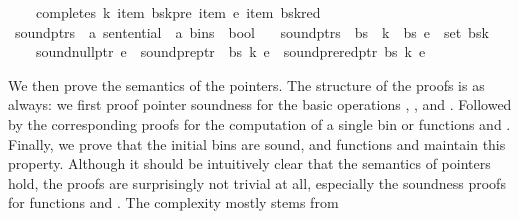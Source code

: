 \begin{isabellebody}
\ \ \ \ completes\ k\ {\isacharparenleft}{\kern0pt}item\ {\isacharparenleft}{\kern0pt}bs{\isacharbang}{\kern0pt}k{\isacharprime}{\kern0pt}{\isacharbang}{\kern0pt}pre{\isacharparenright}{\kern0pt}{\isacharparenright}{\kern0pt}\ {\isacharparenleft}{\kern0pt}item\ e{\isacharparenright}{\kern0pt}\ {\isacharparenleft}{\kern0pt}item\ {\isacharparenleft}{\kern0pt}bs{\isacharbang}{\kern0pt}k{\isacharbang}{\kern0pt}red{\isacharparenright}{\kern0pt}{\isacharparenright}{\kern0pt}{\isachardoublequoteclose}\isanewline
\isanewline
{}\isamarkupfalse%
\ sound{\isacharunderscore}{\kern0pt}ptrs\ {\isacharcolon}{\kern0pt}{\isacharcolon}{\kern0pt}\ {\isachardoublequoteopen}{\isacharprime}{\kern0pt}a\ sentential\ {\isasymRightarrow}\ {\isacharprime}{\kern0pt}a\ bins\ {\isasymRightarrow}\ bool{\isachardoublequoteclose}\ \isanewline
\ \ {\isachardoublequoteopen}sound{\isacharunderscore}{\kern0pt}ptrs\ {\isasymomega}\ bs\ {\isasymequiv}\ {\isasymforall}k\ {\isacharless}{\kern0pt}\ {\isacharbar}{\kern0pt}bs{\isacharbar}{\kern0pt}{\isachardot}{\kern0pt}\ {\isasymforall}e\ {\isasymin}\ set\ {\isacharparenleft}{\kern0pt}bs{\isacharbang}{\kern0pt}k{\isacharparenright}{\kern0pt}{\isachardot}{\kern0pt}\isanewline
\ \ \ \ sound{\isacharunderscore}{\kern0pt}null{\isacharunderscore}{\kern0pt}ptr\ e\ {\isasymand}\ sound{\isacharunderscore}{\kern0pt}pre{\isacharunderscore}{\kern0pt}ptr\ {\isasymomega}\ bs\ k\ e\ {\isasymand}\ sound{\isacharunderscore}{\kern0pt}prered{\isacharunderscore}{\kern0pt}ptr\ bs\ k\ e{\isachardoublequoteclose}%
\begin{isamarkuptext}%
We then prove the semantics of the pointers. The structure of the proofs is as always: we first
proof pointer soundness for the basic operations , , and .
Followed by the corresponding proofs for the computation of a single bin or functions 
and . Finally, we prove that the initial bins are sound, and functions 
and  maintain this property. Although it should be intuitively clear that the
semantics of pointers hold, the proofs are surprisingly not trivial at all, especially the soundness
proofs for functions  and . The complexity mostly stems from

\end{isamarkuptext}
\end{isabellebody}

